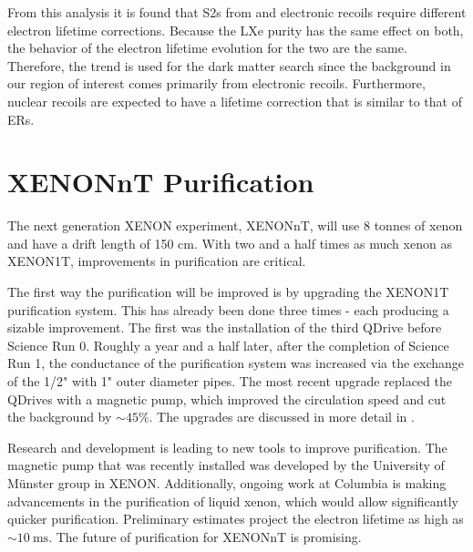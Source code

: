 From this analysis it is found that S2s from \alphadecays and electronic recoils require different electron lifetime corrections.  Because
the LXe
purity has the same effect on both, the behavior of the electron lifetime evolution for the two are the same.  Therefore, the \metakr trend
is used for the dark matter search since the background in our region of interest comes primarily from electronic
recoils.  Furthermore, nuclear recoils are expected to have a lifetime correction that is similar to that of ERs.

\section{XENONnT Purification}
\label{sec:xenonnt}
The next generation XENON experiment, XENONnT, will use 8 tonnes of xenon and have a drift length of 150 cm.  With two and a half times as
much xenon as XENON1T, improvements in purification are critical.

The first way the purification will be improved is by upgrading the XENON1T purification system.  This has already been done three
times - each producing a sizable improvement.  The first was the installation of the third QDrive before Science Run 0.  Roughly a year and
a half later, after the completion of Science Run 1, the conductance of the purification system was increased via the exchange of the 1/2"
with 1" outer diameter pipes.  The most recent upgrade replaced the QDrives with a magnetic pump, which improved the circulation speed and
cut the  background by ${\sim}45\%$.  The upgrades are discussed in more detail in .

Research and development is leading to new tools to improve purification.  The magnetic pump that was recently installed was developed by the
University of M\"unster group in XENON.  Additionally, ongoing work at Columbia is making advancements in the purification of liquid xenon,
which would allow significantly quicker purification.  Preliminary estimates project the electron lifetime as high as
${\sim}10\ \mathrm{ms}$.  The future of purification for XENONnT is promising.